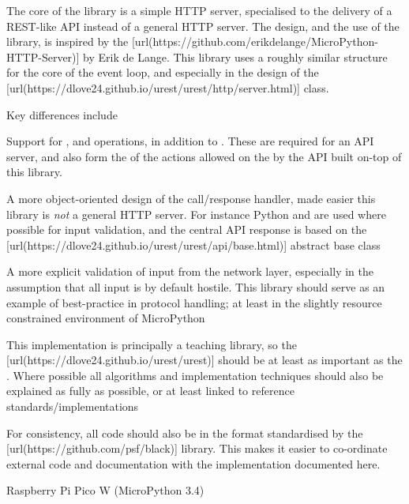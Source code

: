 \stopsection

\startsection[title={Design}]

The core of the library is a simple HTTP server, specialised to the
delivery of a REST-like API instead of a general HTTP server. The
design, and the use of the  library, is inspired by the
[url(https://github.com/erikdelange/MicroPython-HTTP-Server)] by
Erik de Lange. This library uses a roughly similar structure for the
core of the  event loop, and especially in the design of
the
[url(https://dlove24.github.io/urest/urest/http/server.html)]
class.

Key differences include

\startitemize
\item
  Support for ,  and  operations, in
  addition to . These are required for an API server, and also
  form the  of the actions allowed on the  by
  the API built on-top of this library.
\item
  A more object-oriented design of the call/response handler, made
  easier this library is {\em not} a general HTTP server. For instance
  Python  and  are used where possible for
  input validation, and the central API response is based on the
  [url(https://dlove24.github.io/urest/urest/api/base.html)]
  abstract base class
\item
  A more explicit validation of input from the network layer, especially
  in the assumption that all input is by default hostile. This library
  should serve as an example of best-practice in protocol handling; at
  least in the slightly resource constrained environment of MicroPython
\item
  This implementation is principally a teaching library, so the
  [url(https://dlove24.github.io/urest/urest)]
  should be at least as important as the . Where possible
  all algorithms and implementation techniques should also be explained
  as fully as possible, or at least linked to reference
  standards/implementations
\item
  For consistency, all code should also be in the format standardised by
  the [url(https://github.com/psf/black)] library. This
  makes it easier to co-ordinate external code and documentation with
  the implementation documented here.
\stopitemize

\stopsection

\startsection[title={Known Implementations}]

\startitemize[packed]
\item
  Raspberry Pi Pico W (MicroPython 3.4)
\stopitemize

\stopsection

\stopchapter
